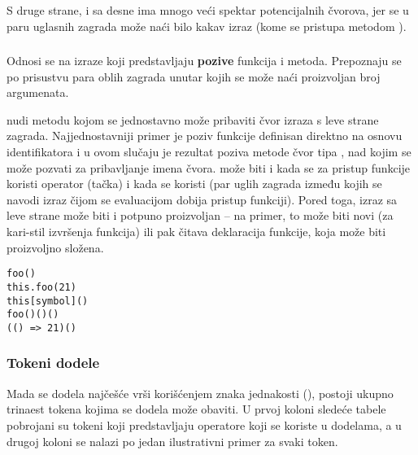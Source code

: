 S druge strane,  i sa desne ima mnogo veći spektar potencijalnih čvorova, jer se u paru uglasnih zagrada može naći bilo kakav izraz (kome se pristupa metodom ).

\subsubsection{}
\label{ast:CallExpression}

Odnosi se na izraze koji predstavljaju \textbf{pozive} funkcija i metoda.
Prepoznaju se po prisustvu para oblih zagrada unutar kojih se može naći proizvoljan broj argumenata.

 nudi metodu  kojom se jednostavno može pribaviti čvor izraza s leve strane zagrada.
Najjednostavniji primer je poziv funkcije definisan direktno na osnovu identifikatora i u ovom slučaju je rezultat poziva metode  čvor tipa , nad kojim se može pozvati  za pribavljanje imena čvora.
 može biti i  kada se za pristup funkcije koristi operator  (tačka) i  kada se koristi \code{[]} (par uglih zagrada između kojih se navodi izraz čijom se evaluacijom dobija pristup funkciji).
Pored toga, izraz sa leve strane može biti i potpuno proizvoljan  -- na primer, to može biti novi  (za kari-stil izvršenja funkcija) ili pak čitava deklaracija funkcije, koja može biti proizvoljno složena.

\begin{verbatim}
foo()
this.foo(21)
this[symbol]()
foo()()()
(() => 21)()
\end{verbatim}

\subsubsection{Tokeni dodele}\label{sec:sk:tokeni-dodele}

Mada se dodela najčešće vrši korišćenjem znaka jednakosti (), postoji ukupno trinaest tokena kojima se dodela može obaviti.
U prvoj koloni sledeće tabele pobrojani su tokeni koji predstavljaju operatore koji se koriste u dodelama, a u drugoj koloni se nalazi po jedan ilustrativni primer za svaki token.

